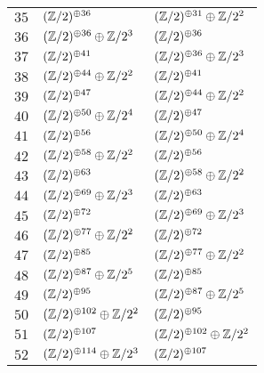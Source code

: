 \begin{supertabular}{|c|p{5.5cm}|p{5.5cm}|}
$35$%
&$(\mathbb{Z}/2)^{\oplus36}$%
&$(\mathbb{Z}/2)^{\oplus31}\oplus\mathbb{Z}/2^{2}$\\

$36$%
&$(\mathbb{Z}/2)^{\oplus36}\oplus\mathbb{Z}/2^{3}$%
&$(\mathbb{Z}/2)^{\oplus36}$\\

$37$%
&$(\mathbb{Z}/2)^{\oplus41}$%
&$(\mathbb{Z}/2)^{\oplus36}\oplus\mathbb{Z}/2^{3}$\\

$38$%
&$(\mathbb{Z}/2)^{\oplus44}\oplus\mathbb{Z}/2^{2}$%
&$(\mathbb{Z}/2)^{\oplus41}$\\

$39$%
&$(\mathbb{Z}/2)^{\oplus47}$%
&$(\mathbb{Z}/2)^{\oplus44}\oplus\mathbb{Z}/2^{2}$\\

$40$%
&$(\mathbb{Z}/2)^{\oplus50}\oplus\mathbb{Z}/2^{4}$%
&$(\mathbb{Z}/2)^{\oplus47}$\\

$41$%
&$(\mathbb{Z}/2)^{\oplus56}$%
&$(\mathbb{Z}/2)^{\oplus50}\oplus\mathbb{Z}/2^{4}$\\

$42$%
&$(\mathbb{Z}/2)^{\oplus58}\oplus\mathbb{Z}/2^{2}$%
&$(\mathbb{Z}/2)^{\oplus56}$\\

$43$%
&$(\mathbb{Z}/2)^{\oplus63}$%
&$(\mathbb{Z}/2)^{\oplus58}\oplus\mathbb{Z}/2^{2}$\\

$44$%
&$(\mathbb{Z}/2)^{\oplus69}\oplus\mathbb{Z}/2^{3}$%
&$(\mathbb{Z}/2)^{\oplus63}$\\

$45$%
&$(\mathbb{Z}/2)^{\oplus72}$%
&$(\mathbb{Z}/2)^{\oplus69}\oplus\mathbb{Z}/2^{3}$\\

$46$%
&$(\mathbb{Z}/2)^{\oplus77}\oplus\mathbb{Z}/2^{2}$%
&$(\mathbb{Z}/2)^{\oplus72}$\\

$47$%
&$(\mathbb{Z}/2)^{\oplus85}$%
&$(\mathbb{Z}/2)^{\oplus77}\oplus\mathbb{Z}/2^{2}$\\

$48$%
&$(\mathbb{Z}/2)^{\oplus87}\oplus\mathbb{Z}/2^{5}$%
&$(\mathbb{Z}/2)^{\oplus85}$\\

$49$%
&$(\mathbb{Z}/2)^{\oplus95}$%
&$(\mathbb{Z}/2)^{\oplus87}\oplus\mathbb{Z}/2^{5}$\\

$50$%
&$(\mathbb{Z}/2)^{\oplus102}\oplus\mathbb{Z}/2^{2}$%
&$(\mathbb{Z}/2)^{\oplus95}$\\

$51$%
&$(\mathbb{Z}/2)^{\oplus107}$%
&$(\mathbb{Z}/2)^{\oplus102}\oplus\mathbb{Z}/2^{2}$\\

$52$%
&$(\mathbb{Z}/2)^{\oplus114}\oplus\mathbb{Z}/2^{3}$%
&$(\mathbb{Z}/2)^{\oplus107}$\\


\end{supertabular}
